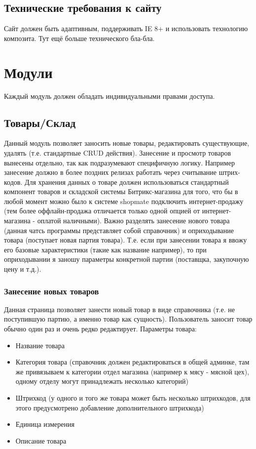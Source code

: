 \documentclass[DIV=calc, paper=a4, fontsize=11pt]{scrartcl} %
\begin{document}
\subsection{Технические требования к сайту}
Сайт должен быть адаптивным, поддерживать IE 8+ и использовать технологию композита.
Тут ещё больше технического бла-бла.


\section{Модули}

Каждый модуль должен обладать индивидуальными правами доступа.

\subsection{Товары/Склад}

Данный модуль позволяет заносить новые товары, редактировать существующие, удалять (т.е. стандартные CRUD действия). Занесение и просмотр товаров вынесены отдельно, так как подразумевают специфичную логику. Например занесение должно в более поздних релизах работать через считывание штрих-кодов. Для хранения данных о товаре должен использоваться стандартный компонент товаров и складской системы Битрикс-магазина для того, что бы в любой момент можно было к системе shopmate подключить интернет-продажу (тем более оффлайн-продажа отличается только одной опцией от интернет-магазина - оплатой наличными). Важно разделять занесение нового товара (данная чатсь программы представляет собой справочник) и оприходывание товара (поступает новая партия товара). Т.е. если при занесении товара я ввожу его базовые характеристики (такие как название например), то при оприходывании я заношу параметры конкретной партии (поставщка, закупочную цену и т.д.).

\subsubsection{Занесение новых товаров} \label{subsubsec:new_goods}

Данная страница позволяет занести новый товар в виде справочника (т.е. не поступившую партию, а именно товар как сущность). Пользователь заносит товар обычно один раз и очень редко редактирует. Параметры товара:
\begin{itemize}
	\item Название товара
	\item Категория товара (справочник должен редактироваться в общей админке, там же привязываем к категории отдел магазина (например к мясу - мясной цех), одному отделу могут принадлежать несколько категорий) \label{subsec:newgoods}
	\item Штрихкод (у одного и того же товара может быть несколько штрихкодов, для этого предусмотрено добавление дополнительного штрихкода)
	\item Единица измерения
	\item Описание товара
\end{itemize}
\end{document}
